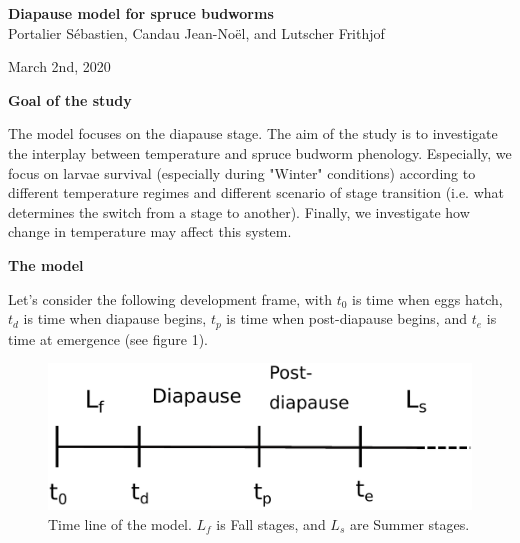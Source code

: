 \documentclass[12 pt]{article}
\begin{document}
\begin{center}
\begin{Large}
\textbf{Diapause model for spruce budworms}\\
Portalier S\'ebastien, Candau Jean-No\"{e}l, and Lutscher Frithjof \\
\end{Large}
March 2nd, 2020
\end{center}
\begin{center}
\begin{large}
\textbf{Goal of the study}
\end{large}
\end{center}
The model focuses on the diapause stage. The aim of the study is to investigate the interplay between temperature and spruce budworm phenology. Especially, we focus on larvae survival (especially during "Winter" conditions) according to different temperature regimes and different scenario of stage transition (i.e. what determines the switch from a stage to another). Finally, we investigate how change in temperature may affect this system. 
\begin{center}
\begin{large}
\textbf{The model}
\end{large}
\end{center}
Let's consider the following development frame, with $t_0$ is time when eggs hatch, $t_d$ is time when diapause begins, $t_p$ is time when post-diapause begins, and $t_e$ is time at emergence (see figure 1). \par
\begin{figure}[h]
\begin{center}
\includegraphics[width=12 cm, keepaspectratio]{Time_Line.pdf}
\caption{Time line of the model. $L_f$ is Fall stages, and $L_s$ are Summer stages.}
\end{center}
\end{figure}
\end{document}
